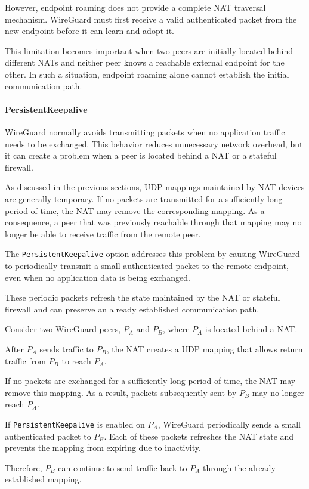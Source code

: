 However, endpoint roaming does not provide a complete NAT traversal mechanism. WireGuard must first receive a valid authenticated packet from the new endpoint before it can learn and adopt it.

This limitation becomes important when two peers are initially located behind different NATs and neither peer knows a reachable external endpoint for the other. In such a situation, endpoint roaming alone cannot establish the initial communication path.

\paragraph{PersistentKeepalive}
WireGuard normally avoids transmitting packets when no application traffic needs to be exchanged. This behavior reduces unnecessary network overhead, but it can create a problem when a peer is located behind a NAT or a stateful firewall.

As discussed in the previous sections, UDP mappings maintained by NAT devices are generally temporary. If no packets are transmitted for a sufficiently long period of time, the NAT may remove the corresponding mapping. As a consequence, a peer that was previously reachable through that mapping may no longer be able to receive traffic from the remote peer.

The \texttt{PersistentKeepalive} option addresses this problem by causing WireGuard to periodically transmit a small authenticated packet to the remote endpoint, even when no application data is being exchanged.

These periodic packets refresh the state maintained by the NAT or stateful firewall and can preserve an already established communication path.

\begin{example}
	Consider two WireGuard peers, \(P_A\) and \(P_B\), where \(P_A\) is located behind a NAT.

	After \(P_A\) sends traffic to \(P_B\), the NAT creates a UDP mapping that allows return traffic from \(P_B\) to reach \(P_A\).

	If no packets are exchanged for a sufficiently long period of time, the NAT may remove this mapping. As a result, packets subsequently sent by \(P_B\) may no longer reach \(P_A\).

	If \texttt{PersistentKeepalive} is enabled on \(P_A\), WireGuard periodically sends a small authenticated packet to \(P_B\). Each of these packets refreshes the NAT state and prevents the mapping from expiring due to inactivity.

	Therefore, \(P_B\) can continue to send traffic back to \(P_A\) through the already established mapping.
\end{example}

